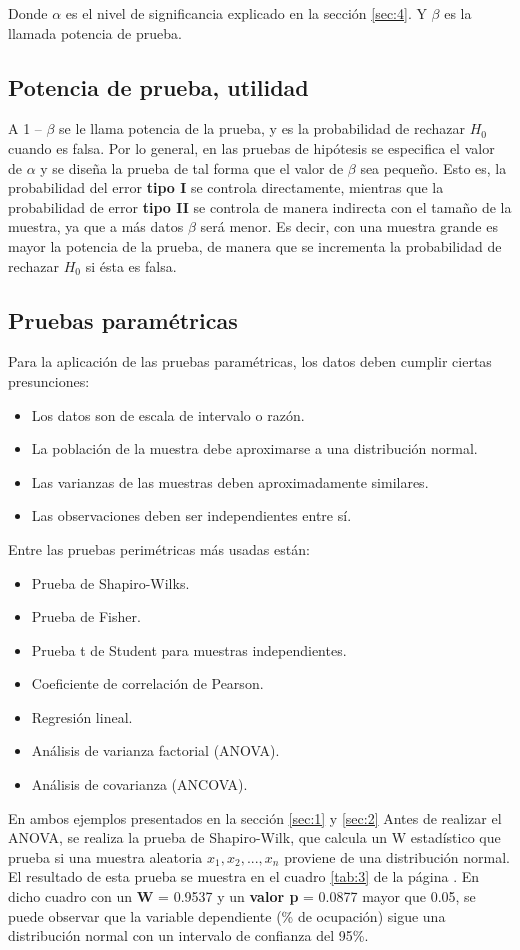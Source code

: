 \documentclass{article}
\begin{document}
Donde $\alpha$ es el nivel de significancia explicado en la sección \ref{sec:4}. Y $\beta$ es la llamada potencia de prueba.

\subsection{Potencia de prueba, utilidad}
\label{sec:6}
A 1 – $\beta$ se le llama potencia de la prueba, y es la probabilidad de rechazar $H_{0}$
cuando es falsa. Por lo general, en las pruebas de hipótesis se especifica el valor de $\alpha$ y se diseña la prueba de tal forma que el valor de $\beta$ sea pequeño. Esto es, la probabilidad del error \textbf{tipo I} se controla directamente, mientras que la probabilidad de error \textbf{tipo II} se controla de manera indirecta con el tamaño de la muestra, ya que a más datos $\beta$ será menor. Es decir, con una muestra grande es mayor la potencia de la prueba, de manera que se incrementa la probabilidad de rechazar $H_{0}$ si ésta es falsa.

\subsection{Pruebas paramétricas}
\label{sec:7}

Para la aplicación de las pruebas paramétricas, los datos deben cumplir ciertas presunciones:
\begin{itemize}
    \item Los datos son de escala de intervalo o razón.
    \item La población de la muestra debe aproximarse a una distribución normal.
    \item Las varianzas de las muestras deben aproximadamente similares.
    \item Las observaciones deben ser independientes entre sí.
\end{itemize}
Entre las pruebas perimétricas más usadas están: 
\begin{itemize}
\item Prueba de Shapiro-Wilks.
\item Prueba de Fisher.
\item Prueba t de Student para muestras independientes.
\item Coeficiente de correlación de Pearson.
\item Regresión lineal.
\item Análisis de varianza factorial (ANOVA).
\item Análisis de covarianza (ANCOVA).
\end{itemize}
 En ambos ejemplos presentados en la sección \ref{sec:1} y \ref{sec:2} Antes de realizar el ANOVA, se realiza la prueba de Shapiro-Wilk, que calcula un W estadístico que prueba si una muestra aleatoria $x_{1},x_{2},...,x_{n}$ proviene de una distribución normal. El resultado de esta prueba se muestra en el cuadro \ref{tab:3} de la página \pageref{tab:3}. En dicho cuadro con un \textbf{W} = 0.9537  y un  \textbf{valor p} = 0.0877 mayor que 0.05, se puede observar que la variable dependiente (\% de ocupación) sigue una distribución normal con un intervalo de confianza del 95\%.
\end{document}
